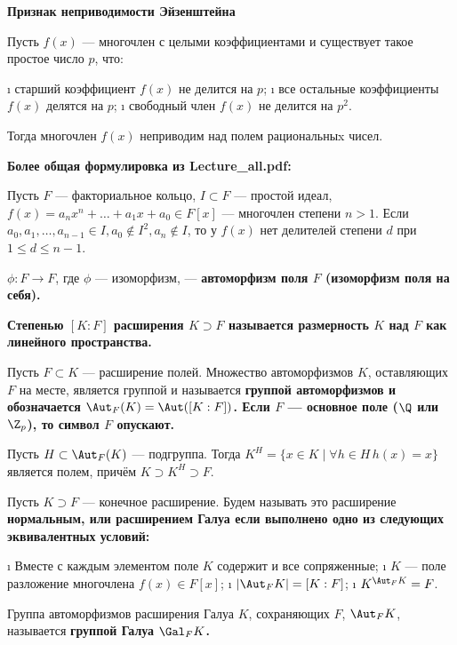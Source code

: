 \begin{defn}
\bf{Признак неприводимости Эйзенштейна}

Пусть \(f(x)\) --- многочлен с целыми коэффициентами и существует такое простое число \(p\), что:

\begin{enumerate}
\def\labelenumi{\arabic{enumi}.}
\tightlist
\i
  старший коэффициент \(f(x)\) не делится на \(p\);
\i
  все остальные коэффициенты \(f(x)\) делятся на \(p\);
\i
  свободный член \(f(x)\) не делится на \(p^2\).
\end{enumerate}

Тогда многочлен \(f(x)\) неприводим над полем рациональныx чисел.

\bf{Более общая формулировка из Lecture\_all.pdf:}

Пусть \(F\) --- факториальное кольцо, \(I \subset F\) --- простой идеал, \(f(x) = a_nx^n+\dots+a_1x + a_0 \in F [x]\) --- многочлен степени \(n > 1\).
Если \(a_0, a_1, \dots, a_{n-1} \in I, a_0 \not\in I^2, a_n \not\in I\), то у \(f(x)\) нет делителей степени \(d\) при \(1 \le d\le n-1\).

\end{defn}

\begin{defn}
$\phi:F \to F$, где $\phi$ --- изоморфизм, --- \bf{автоморфизм} поля $F$ (изоморфизм поля на себя).

\bf{Степенью} $[K : F ]$ расширения $K \supset F$ называется размерность $K$ над $F$ как линейного пространства.

Пусть \(F \subset K\) --- расширение полей. Множество автоморфизмов \(K\), оставляющих \(F\) на месте, является группой и называется \bf{группой автоморфизмов} и обозначается \(\Aut_F(K) = \Aut([K:F])\). Если \(F\) --- основное поле (\(\Q\) или \(\Z_p\)), то символ \(F\) опускают.
\end{defn}

\begin{defn}
Пусть \(H \subset \Aut_F(K)\) --- подгруппа. Тогда \(K^{H} = \{x \in K \mid \forall h \in H \, h(x)=x\}\) является полем, причём \(K \supset K^H \supset F\).
\end{defn}

\begin{defn}
Пусть \(K \supset F\) --- конечное расширение. Будем называть это расширение \bf{нормальным}, или \bf{расширением Галуа} если выполнено одно из следующих эквивалентных условий:

\begin{enumerate}
\def\labelenumi{(\arabic{enumi})}
\tightlist
\i
  Вместе с каждым элементом поле \(K\) содержит и все сопряженные;
\i
  \(K\) --- поле разложение многочлена \(f(x) \in F[x]\);
\i
  \(|\Aut_F{K}| = [K:F]\);
\i
  \(K^{\Aut_F{K}}=F\).
\end{enumerate}

\end{defn}

\begin{defn}
Группа автоморфизмов расширения Галуа \(K\), сохраняющих \(F\), \(\Aut_FK\), называется \bf{группой Галуа} \(\Gal_FK\).
\end{defn}


